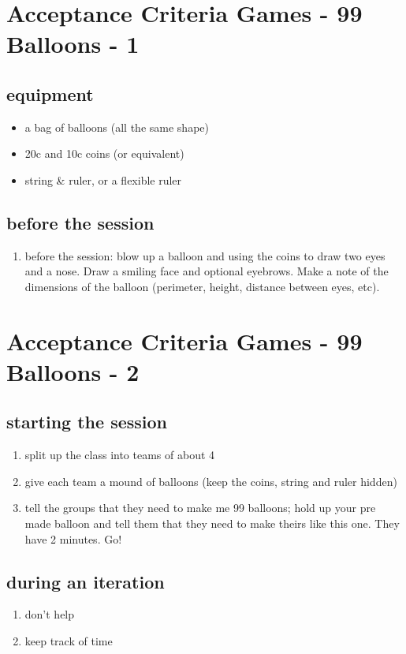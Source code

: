 \section*{Acceptance Criteria Games - 99 Balloons - 1}
\subsection*{equipment}
\begin{itemize}
\item a bag of balloons (all the same shape)
\item 20c and 10c coins (or equivalent)
\item string \& ruler, or a flexible ruler
\end{itemize}
\subsection*{before the session}
\begin{enumerate}
\item before the session: blow up a balloon and using the coins to draw two eyes and a nose. Draw a smiling face and optional eyebrows. Make a note of the dimensions of the balloon (perimeter, height, distance between eyes, etc).
\end{enumerate}
\clearpage
\section*{Acceptance Criteria Games - 99 Balloons - 2}
\subsection*{starting the session}
\begin{enumerate}
\item split up the class into teams of about 4
\item give each team a mound of balloons (keep the coins, string and ruler hidden)
\item tell the groups that they need to make me 99 balloons; hold up your pre made balloon and tell them that they need to make theirs like this one. They have 2 minutes. Go!
\end{enumerate}
\subsection*{during an iteration}
\begin{enumerate}
\item don't help
\item keep track of time
\end{enumerate}
\clearpage
